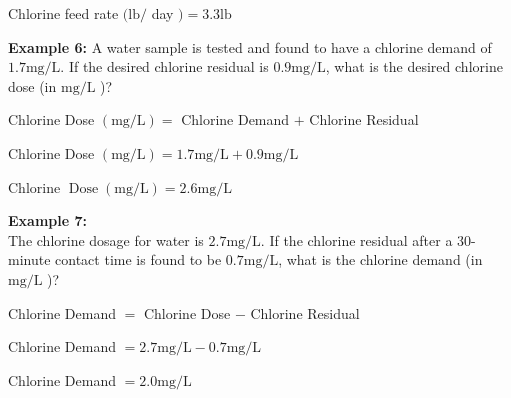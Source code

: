 Chlorine feed rate $(\mathrm{lb} /$ day $)=3.3 \mathrm{lb}$

\textbf{Example 6:} A water sample is tested and found to have a chlorine demand of $1.7 \mathrm{mg} / \mathrm{L}$. If the desired chlorine residual is $0.9 \mathrm{mg} / \mathrm{L}$, what is the desired chlorine dose (in $\mathrm{mg} / \mathrm{L}$ )?

Chlorine Dose $(\mathrm{mg} / \mathrm{L})=$ Chlorine Demand $+$ Chlorine Residual

Chlorine Dose $(\mathrm{mg} / \mathrm{L})=1.7 \mathrm{mg} / \mathrm{L}+0.9 \mathrm{mg} / \mathrm{L}$

Chlorine $\operatorname{Dose}(\mathrm{mg} / \mathrm{L})=2.6 \mathrm{mg} / \mathrm{L}$

\textbf{Example 7:}\\
The chlorine dosage for water is $2.7 \mathrm{mg} / \mathrm{L}$. If the chlorine residual after a 30-minute contact time is found to be $0.7 \mathrm{mg} / \mathrm{L}$, what is the chlorine demand (in $\mathrm{mg} / \mathrm{L}$ )?

Chlorine Demand $=$ Chlorine Dose $-$ Chlorine Residual

Chlorine Demand $=2.7 \mathrm{mg} / \mathrm{L}-0.7 \mathrm{mg} / \mathrm{L}$

Chlorine Demand $=2.0 \mathrm{mg} / \mathrm{L}$

